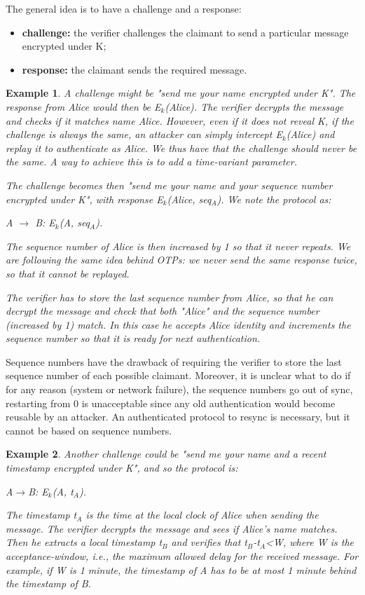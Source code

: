 \documentclass[a4paper, 12pt]{report}
\newtheorem{example}{\textbf{Example}}
\begin{document}
The general idea is to have a challenge and a response:
\begin{itemize}
	\item \textbf{challenge:} the verifier challenges the claimant to send a particular message encrypted under K;
	\item \textbf{response:} the claimant sends the required message.
\end{itemize}

\begin{example}
	A challenge might be "\textit{send me your name encrypted under K}". The response from Alice would then be E$_k$(Alice). The verifier decrypts the message and checks if it matches name Alice. However, even if it does not reveal K, if the challenge is always the same, an attacker can simply intercept E$_k$(Alice) and replay it to authenticate as Alice. We thus have that the challenge should never be the same. A way to achieve this is to add a \textit{time-variant} parameter.
	
	The challenge becomes then "\textit{send me your name and your sequence number encrypted under K}", with response E$_k$(Alice, seq$_A$). We note the protocol as:
	\begin{center}
		A $\rightarrow$ B: E$_k$(A, seq$_A$).
	\end{center}
	The sequence number of Alice is then increased by 1 so that it never repeats. We are following the same idea behind OTPs: we never send the same response twice, so that it cannot be replayed.
	
	The verifier has to store the last sequence number from Alice, so that he can decrypt the message and check that both "Alice" and the sequence number (increased by 1) match. In this case he accepts Alice identity and increments the sequence number so that it is ready for next authentication.
\end{example}

Sequence numbers have the drawback of requiring the verifier to store the last sequence number of each possible claimant. Moreover, it is unclear what to do if for any reason (system or network failure), the sequence numbers go out of sync, restarting from 0 is unacceptable since any old authentication would become reusable by an attacker. An authenticated protocol to resync is necessary, but it cannot be based on sequence numbers.

\begin{example}
	Another challenge could be "\textit{send me your name and a recent timestamp encrypted under K}", and so the protocol is:	
	\begin{center}
		A$\rightarrow$B: E$_k$(A, t$_A$).
	\end{center}
	The timestamp t$_A$ is the time at the local clock of Alice when sending the message. The verifier decrypts the message and sees if Alice's name matches. Then he extracts a local timestamp t$_B$ and verifies that t$_B$-t$_A$<W, where W is the acceptance-window, i.e., the maximum allowed delay for the received message. For example, if W is 1 minute, the timestamp of A has to be at most 1 minute behind the timestamp of B.
\end{example}
\end{document}
